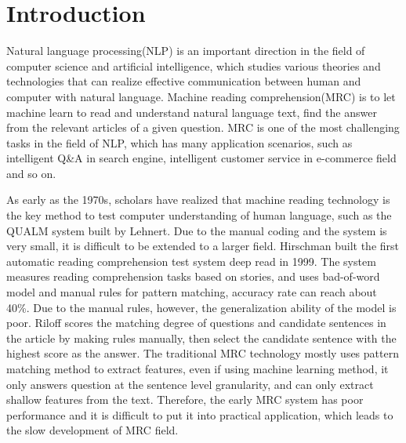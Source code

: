 \section{Introduction}
Natural language processing(NLP) is an important direction in the field of computer science and 
artificial intelligence, which studies various theories and technologies that can realize effective 
communication between human and computer with natural language. Machine reading comprehension(MRC) is to let 
machine learn to read and understand natural language text, find the answer from the relevant articles of a given question.
MRC is one of the most challenging tasks in the field of NLP, which has many application scenarios, 
such as intelligent Q\&A in search engine, intelligent customer service in e-commerce field and so on.

As early as the 1970s, scholars have realized that machine reading technology is the key method to test 
computer understanding of human language, such as the QUALM system built by Lehnert. Due to the manual coding and  the system is very small, 
it is difficult to be extended to a larger field. 
Hirschman built the first automatic reading comprehension test system deep read in 1999. The system measures 
reading comprehension tasks based on stories, and uses bad-of-word model and manual rules for pattern matching, 
accuracy rate can reach about 40\%. Due to the manual rules, however, the generalization ability of the model is poor.
Riloff scores the matching degree of questions and candidate sentences in the article by making rules manually, then 
select the candidate sentence with the highest score as the answer.
The traditional MRC technology mostly uses pattern matching method to extract features, even if using machine learning method, 
it only answers question at the sentence level granularity, and can only extract shallow features from the text. 
Therefore, the early MRC system has poor performance and it is difficult to put it into practical application, which 
leads to the slow development of MRC field.

